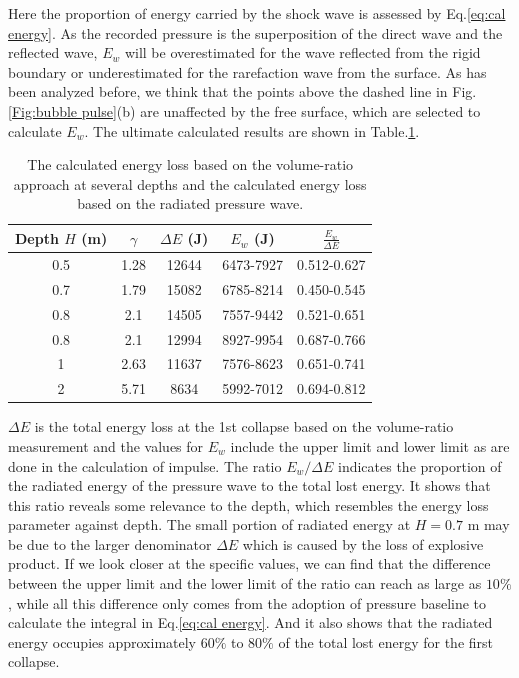 \documentclass[%
 aip,
 amsmath,amssymb,
 reprint,%
]{revtex4-1}
\begin{document}
{ Here the proportion of energy carried by the shock wave is assessed by Eq.\eqref{eq:cal energy}. As the recorded pressure is the superposition of the direct wave and the reflected wave, $E_w$ will be overestimated for the wave reflected from the rigid boundary or underestimated for the rarefaction wave from the surface. As has been analyzed before, we think that the points above the dashed line in Fig.\ref{Fig:bubble pulse}(b) are unaffected by the free surface, which are selected to calculate $E_w$. The ultimate calculated results are shown in Table.\ref{table:energy ratio}.
\begin{table}
	\centering
	\caption{The calculated energy loss based on the volume-ratio approach at several depths and the calculated energy loss based on the radiated pressure wave.}
	\begin{ruledtabular}
	\begin{tabular}{ccccc}	
		Depth $H$ (m)& $\gamma$& $\Delta E$ (J) & $E_w$ (J)& $\frac{E_w}{\Delta E}$\\
		\hline
		0.5& 1.28&12644&6473-7927&0.512-0.627\\
		0.7& 1.79&15082&6785-8214 &0.450-0.545\\
		0.8& 2.1&14505&7557-9442&0.521-0.651\\
		0.8& 2.1&12994&8927-9954&0.687-0.766\\
		1& 2.63&11637&7576-8623&0.651-0.741\\
		2& 5.71&8634&5992-7012&0.694-0.812\\
	\end{tabular}
	\end{ruledtabular}
	\label{table:energy ratio}
\end{table}
\noindent $\Delta E$ is the total energy loss at the 1st collapse based on the volume-ratio measurement and the values for $E_w$ include the upper limit and lower limit as are done in the calculation of impulse. The ratio $E_w/\Delta E$ indicates the proportion of the radiated energy of the pressure wave to the total lost energy. It shows that this ratio reveals some relevance to the depth, which resembles  the energy loss parameter against depth. The small portion of radiated energy at $H=0.7$ m may be due to the larger denominator $\Delta E$ which is caused by the loss of explosive product. If we look closer at the specific values, we can find that the difference between the upper limit and the lower limit of the ratio can reach as large as $10\%$, while all this difference only comes from the adoption of pressure baseline to calculate the integral in Eq.\eqref{eq:cal energy}. And it also shows that the radiated energy occupies approximately 60$\%$ to 80$\%$ of the total lost energy for the first collapse.

}
\end{document}
